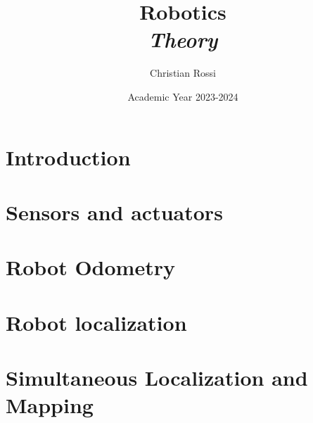 \documentclass[12pt, a4paper]{report}
\title{Robotics \\ \textit{Theory}}
\author{Christian Rossi}
\date{Academic Year 2023-2024}
\begin{document}
    \maketitle

    

    \cleardoublepage{}

    \tableofcontents

    \cleardoublepage{}

    \chapter{Introduction}
    
    
    

    \chapter{Sensors and actuators}
    
    

    \chapter{Robot Odometry}
    
        
        
        
      
      
      
      
      

    \chapter{Robot localization}
    
    
    
    
    
    
    

    \chapter{Simultaneous Localization and Mapping}
    
    
    
    
    
    
\end{document}
